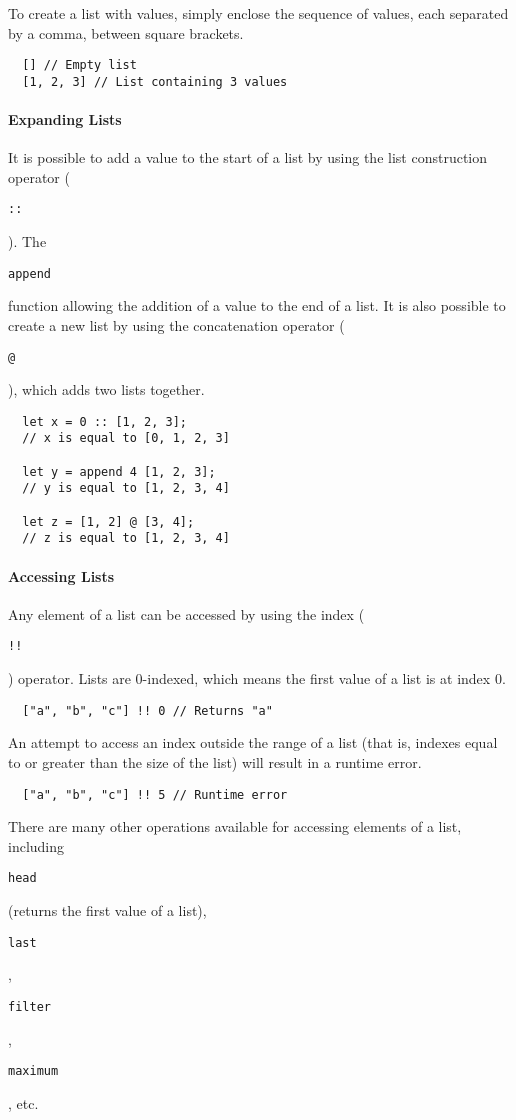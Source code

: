 \documentclass{article}
\def\code#1{\begin{footnotesize}\texttt{#1}\end{footnotesize}}
\begin{document}
To create a list with values, simply enclose the sequence of values, each separated by a comma, between square brackets.

\begin{lstlisting}
  [] // Empty list
  [1, 2, 3] // List containing 3 values
\end{lstlisting}

\paragraph{Expanding Lists}

It is possible to add a value to the start of a list by using the list construction operator (\code{::}).
The \code{append} function allowing the addition of a value to the end of a list.
It is also possible to create a new list by using the concatenation operator (\code{@}), which adds two lists together.

\begin{lstlisting}
  let x = 0 :: [1, 2, 3];
  // x is equal to [0, 1, 2, 3]

  let y = append 4 [1, 2, 3];
  // y is equal to [1, 2, 3, 4]

  let z = [1, 2] @ [3, 4];
  // z is equal to [1, 2, 3, 4]
\end{lstlisting}

\paragraph{Accessing Lists}

Any element of a list can be accessed by using the index (\code{!!}) operator.
Lists are 0-indexed, which means the first value of a list is at index 0.

\begin{lstlisting}
  ["a", "b", "c"] !! 0 // Returns "a"
\end{lstlisting}

An attempt to access an index outside the range of a list (that is, indexes equal to or greater than the size of the list) will result in a runtime error.

\begin{lstlisting}
  ["a", "b", "c"] !! 5 // Runtime error
\end{lstlisting}

There are many other operations available for accessing elements of a list, including \code{head} (returns the first value of a list), \code{last}, \code{filter}, \code{maximum}, etc.
\end{document}
